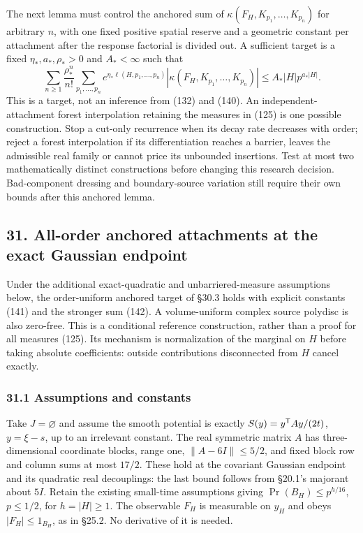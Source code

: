 \documentclass[11pt,a4paper]{article}
\begin{document}
The next lemma must control the anchored sum of
\(\kappa(F_H,K_{p_1},\ldots,K_{p_n})\) for arbitrary \(n\), with one
fixed positive spatial reserve and a geometric constant per attachment
after the response factorial is divided out. A sufficient target is a
fixed \(\eta_*,a_*,\rho_*>0\) and \(A_*<\infty\) such that
\[\sum_{n\ge1}\frac{\rho_*^n}{n!}
 \sum_{p_1,\ldots,p_n}
 e^{\eta_*\ell(H,p_1,\ldots,p_n)}
 |\kappa(F_H,K_{p_1},\ldots,K_{p_n})|
\le A_*|H|p^{a_*|H|}.\] This is a target, not an inference from (132)
and (140). An independent-attachment forest interpolation retaining the
measures in (125) is one possible construction. Stop a cut-only
recurrence when its decay rate decreases with order; reject a forest
interpolation if its differentiation reaches a barrier, leaves the
admissible real family or cannot price its unbounded insertions. Test at
most two mathematically distinct constructions before changing this
research decision. Bad-component dressing and boundary-source variation
still require their own bounds after this anchored lemma.

\hypertarget{all-order-anchored-attachments-at-the-exact-gaussian-endpoint}{%
\subsection{31. All-order anchored attachments at the exact Gaussian
endpoint}\label{all-order-anchored-attachments-at-the-exact-gaussian-endpoint}}

Under the additional exact-quadratic and unbarriered-measure assumptions
below, the order-uniform anchored target of §30.3 holds with explicit
constants (141) and the stronger sum (142). A volume-uniform complex
source polydisc is also zero-free. This is a conditional reference
construction, rather than a proof for all measures (125). Its mechanism
is normalization of the marginal on \(H\) before taking absolute
coefficients: outside contributions disconnected from \(H\) cancel
exactly.

\hypertarget{assumptions-and-constants}{%
\subsubsection{31.1 Assumptions and
constants}\label{assumptions-and-constants}}

Take \(J=\varnothing\) and assume the smooth potential is exactly
\(S(y)=y^{\sf T}Ay/(2t)\), \(y=\xi-s\), up to an irrelevant constant.
The real symmetric matrix \(A\) has three-dimensional coordinate blocks,
range one, \(\|A-6I\|\le5/2\), and fixed block row and column sums at
most \(17/2\). These hold at the covariant Gaussian endpoint and its
quadratic real decouplings: the last bound follows from §20.1's majorant
about \(5I\). Retain the existing small-time assumptions giving
\(\Pr(B_H)\le p^{h/16}\), \(p\le1/2\), for \(h=|H|\ge1\). The observable
\(F_H\) is measurable on \(y_H\) and obeys \(|F_H|\le1_{B_H}\), as in
§25.2. No derivative of it is needed.
\end{document}
